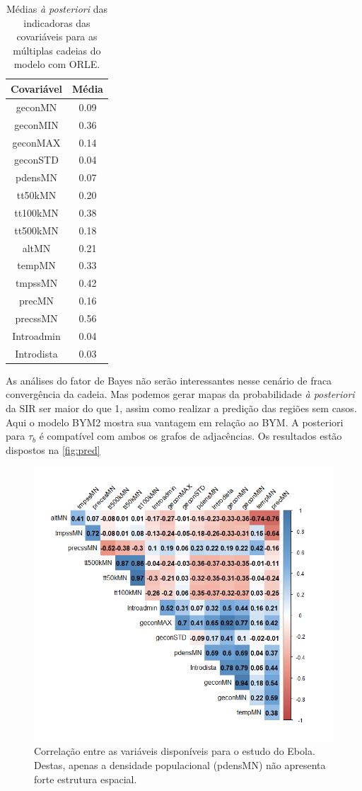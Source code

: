 \begin{table}[]
    \centering
    \begin{tabular}{|c|c|}
    \hline
            \textbf{Covariável}& \textbf{Média} \\ \hline
            geconMN  & 0.09  \\ \hline
            geconMIN  & 0.36  \\ \hline
            geconMAX  & 0.14  \\ \hline
            geconSTD  & 0.04  \\ \hline
            pdensMN  & 0.07  \\ \hline
            tt50kMN  & 0.20  \\ \hline
            tt100kMN  & 0.38  \\ \hline
            tt500kMN  & 0.18  \\ \hline
            altMN  & 0.21  \\ \hline
            tempMN & 0.33  \\ \hline
            tmpssMN & 0.42 \\ \hline
            precMN & 0.16 \\ \hline
            precssMN & 0.56  \\ \hline
            Introadmin & 0.04  \\ \hline
            Introdista & 0.03 \\ \hline
    \end{tabular}
    \caption{Médias \textit{à posteriori} das indicadoras das covariáveis para as múltiplas cadeias do modelo com ORLE.}
    \label{tab:posterior_gamma}
\end{table}



As análises do fator de Bayes não serão interessantes nesse cenário de fraca convergência da cadeia. Mas podemos gerar mapas da probabilidade \textit{à posteriori} da SIR ser maior do que 1, assim como realizar a predição das regiões sem casos. Aqui o modelo BYM2 mostra sua vantagem em relação ao BYM. A posteriori para $\tau_b$ é compatível com ambos os grafos de adjacências. Os resultados estão dispostos na \autoref{fig:pred}

\begin{figure}
    \centering
    \includegraphics[width = 0.5\linewidth]{images/correlation_btwn_cov_ebola.png}
    \caption{Correlação entre as variáveis disponíveis para o estudo do Ebola. Destas, apenas a densidade populacional (pdensMN) não apresenta forte estrutura espacial.}
    \label{fig:corplot}
\end{figure}


